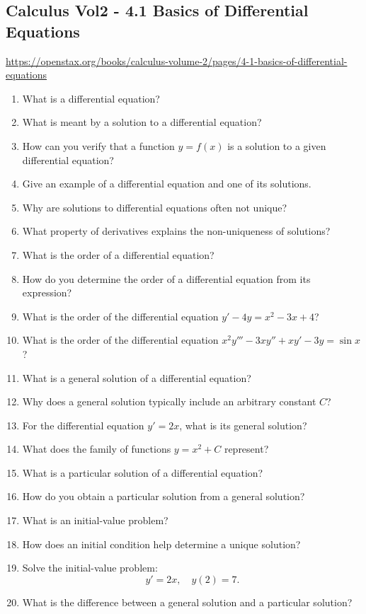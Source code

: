 \subsection{Calculus Vol2 - 4.1 Basics of Differential Equations}

\url{https://openstax.org/books/calculus-volume-2/pages/4-1-basics-of-differential-equations}

\begin{enumerate}
  \item What is a differential equation?
  \item What is meant by a solution to a differential equation?
  \item How can you verify that a function $y=f(x)$ is a solution to a given differential equation?
  \item Give an example of a differential equation and one of its solutions.
  \item Why are solutions to differential equations often not unique?
  \item What property of derivatives explains the non-uniqueness of solutions?
  \item What is the order of a differential equation?
  \item How do you determine the order of a differential equation from its expression?
  \item What is the order of the differential equation $y' - 4y = x^2 - 3x + 4$?
  \item What is the order of the differential equation $x^2 y''' - 3x y'' + x y' - 3y = \sin x$?
  \item What is a general solution of a differential equation?
  \item Why does a general solution typically include an arbitrary constant $C$?
  \item For the differential equation $y' = 2x$, what is its general solution?
  \item What does the family of functions $y = x^2 + C$ represent?
  \item What is a particular solution of a differential equation?
  \item How do you obtain a particular solution from a general solution?
  \item What is an initial-value problem?
  \item How does an initial condition help determine a unique solution?
  \item Solve the initial-value problem:
    \[
      y' = 2x, \quad y(2) = 7.
    \]
  \item What is the difference between a general solution and a particular solution?

\end{enumerate}
